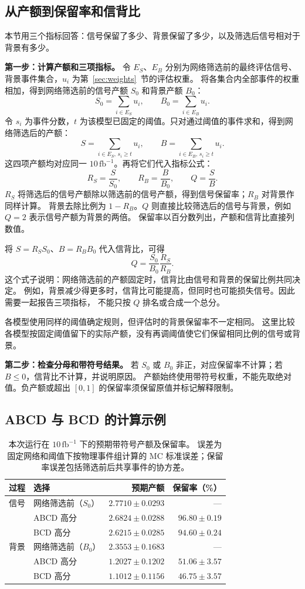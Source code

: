 \documentclass[11pt,a4paper,fontset=fandol,scheme=plain]{ctexart}
\begin{document}
\subsection{从产额到保留率和信背比}
本节用三个指标回答：信号保留了多少、背景保留了多少，以及筛选后信号相对于背景有多少。

\textbf{第一步：计算产额和三项指标。}
令 $E_S$、$E_B$ 分别为网络筛选前的最终评估信号、背景事件集合，$u_i$ 为第~\ref{sec:weights}~节的评估权重。
将各集合内全部事件的权重相加，得到网络筛选前的信号产额 $S_0$ 和背景产额 $B_0$：
\[
 S_0=\sum_{i\in E_S}u_i,\qquad
 B_0=\sum_{i\in E_B}u_i.
\]
令 $s_i$ 为事件分数，$t$ 为该模型已固定的阈值。只对通过阈值的事件求和，得到网络筛选后的产额：
\[
 S=\sum_{i\in E_S,\,s_i\geq t}u_i,\qquad
 B=\sum_{i\in E_B,\,s_i\geq t}u_i.
\]
这四项产额均对应同一 $10\,\mathrm{fb}^{-1}$。再将它们代入指标公式：
\[
 R_S=\frac{S}{S_0},\qquad R_B=\frac{B}{B_0},\qquad Q=\frac{S}{B}.
\]
$R_S$ 将筛选后的信号产额除以筛选前的信号产额，得到信号保留率；$R_B$ 对背景作同样计算。
背景去除比例为 $1-R_B$。$Q$ 则直接比较筛选后的信号与背景，例如 $Q=2$ 表示信号产额为背景的两倍。
保留率以百分数列出，产额和信背比直接列数值。

将 $S=R_SS_0$、$B=R_BB_0$ 代入信背比，可得
\[
 Q=\frac{S_0}{B_0}\frac{R_S}{R_B}.
\]
这个式子说明：网络筛选前的产额固定时，信背比由信号和背景的保留比例共同决定。
例如，背景减少得更多时，信背比可能提高，但同时也可能损失信号。因此需要一起报告三项指标，
不能只按 $Q$ 排名或合成一个总分。

各模型使用同样的阈值确定规则，但评估时的背景保留率不一定相同。
这里比较各模型按固定阈值留下的实际产额，没有再调阈值使它们保留相同比例的信号或背景。

\textbf{第二步：检查分母和带符号结果。}
若 $S_0$ 或 $B_0$ 非正，对应保留率不计算；若 $B\leq0$，信背比不计算，并说明原因。
产额始终使用带符号权重，不能先取绝对值。负产额或超出 $[0,1]$ 的保留率须保留原值并标记解释限制。

\subsection{ABCD 与 BCD 的计算示例}
\begin{table}[H]
\caption{本次运行在 $10\,\mathrm{fb}^{-1}$ 下的预期带符号产额及保留率。
误差为固定网络和阈值下按物理事件组计算的 MC 标准误差；保留率误差包括筛选前后共享事件的协方差。}
\label{tab:yields}
\centering
\begin{tabular}{llrr}
\toprule
过程 & 选择 & 预期产额 & 保留率（\%） \\
\midrule
信号 & 网络筛选前（$S_0$） & $2.7710\pm0.0293$ & --- \\
 & ABCD 高分 & $2.6824\pm0.0288$ & $96.80\pm0.19$ \\
 & BCD 高分 & $2.6215\pm0.0285$ & $94.60\pm0.24$ \\
背景 & 网络筛选前（$B_0$） & $2.3553\pm0.1683$ & --- \\
 & ABCD 高分 & $1.2027\pm0.1202$ & $51.06\pm3.57$ \\
 & BCD 高分 & $1.1012\pm0.1156$ & $46.75\pm3.57$ \\
\bottomrule
\end{tabular}
\end{table}
\end{document}
